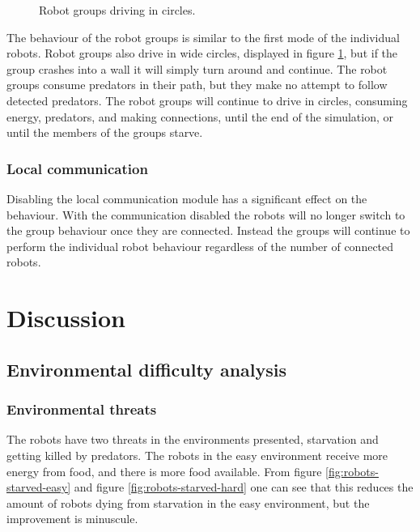 \begin{figure}[H]
	
	\centering
	\caption{Robot groups driving in circles.}
	\label{fig:group-circles}
\end{figure}

The behaviour of the robot groups is similar to the first mode of the individual robots.
Robot groups also drive in wide circles, displayed in figure \ref{fig:group-circles}, but if the group crashes into a wall it will simply turn around and continue.
The robot groups consume predators in their path, but they make no attempt to follow detected predators.
The robot groups will continue to drive in circles, consuming energy, predators, and making connections, until the end of the simulation, or until the members of the groups starve.

\subsubsection{Local communication}
\label{sec:disable-local-communication}
Disabling the local communication module has a significant effect on the behaviour.
With the communication disabled the robots will no longer switch to the group behaviour once they are connected.
Instead the groups will continue to perform the individual robot behaviour regardless of the number of connected robots.

\section{Discussion}

\subsection{Environmental difficulty analysis}
\subsubsection{Environmental threats}
The robots have two threats in the environments presented, starvation and getting killed by predators.
The robots in the easy environment receive more energy from food, and there is more food available.
From figure \ref{fig:robots-starved-easy} and figure \ref{fig:robots-starved-hard} one can see that this reduces the amount of robots dying from starvation in the easy environment, but the improvement is minuscule.

